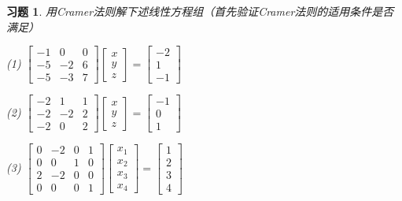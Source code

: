 \documentclass[a4paper]{book}
\newtheorem{ex}{习题}[chapter]
\newcommand{\enum}{\begin{list}{}{\setlength{\leftmargin}{0pt} \setlength{\itemindent}{2.5em} \setlength{\listparindent}{2em}}}
\begin{document}
\begin{ex} \label{ex:2.18}
用Cramer法则解下述线性方程组（首先验证Cramer法则的适用条件是否满足）

\enum
\item[(1)] $\begin{bmatrix} -1 & 0 & 0 \\ -5 & -2 & 6 \\ -5 & -3 & 7 \end{bmatrix} \begin{bmatrix} x \\ y \\ z \end{bmatrix} = \begin{bmatrix} -2 \\ 1 \\ -1 \end{bmatrix}$

\item[(2)] $\begin{bmatrix} -2 & 1 & 1 \\ -2 & -2 & 2 \\ -2 & 0 & 2 \end{bmatrix} \begin{bmatrix} x \\ y \\ z \end{bmatrix} = \begin{bmatrix} -1 \\ 0 \\ 1 \end{bmatrix}$

\item[(3)] $\begin{bmatrix} 0 & -2 & 0 & 1 \\ 0 & 0 & 1 & 0 \\ 2 & -2 & 0 & 0 \\ 0 & 0 & 0 & 1 \end{bmatrix} \begin{bmatrix} x_1 \\ x_2 \\ x_3 \\ x_4 \end{bmatrix} = \begin{bmatrix} 1 \\ 2 \\ 3 \\ 4 \end{bmatrix}$
\end{list}
\end{ex}
\end{document}
